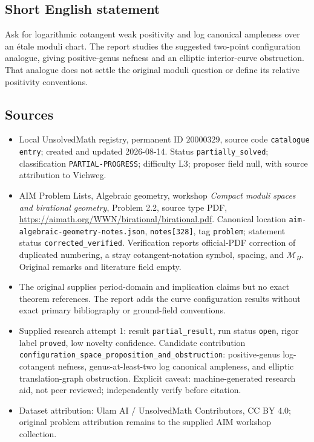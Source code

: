 \documentclass[11pt]{article}
\begin{document}
\subsection{Short English statement}
Ask for logarithmic cotangent weak positivity and log canonical ampleness over an étale moduli chart. The report studies the suggested two-point configuration analogue, giving positive-genus nefness and an elliptic interior-curve obstruction. That analogue does not settle the original moduli question or define its relative positivity conventions.
\subsection{Sources}
\begin{itemize}
\item Local UnsolvedMath registry, permanent ID $20000329$, source code \texttt{catalogue entry}; created and updated 2026-08-14. Status \texttt{partially\_solved}; classification \texttt{PARTIAL-PROGRESS}; difficulty L3; proposer field null, with source attribution to Viehweg.
\item AIM Problem Lists, Algebraic geometry, workshop \emph{Compact moduli spaces and birational geometry}, Problem 2.2, source type PDF, \url{https://aimath.org/WWN/birational/birational.pdf}. Canonical location \texttt{aim-algebraic-geometry-notes.json}, \texttt{notes[328]}, tag \texttt{problem}; statement status \texttt{corrected\_verified}. Verification reports official-PDF correction of duplicated numbering, a stray cotangent-notation symbol, spacing, and $\mathcal M_H$. Original remarks and literature field empty.
\item The original supplies period-domain and implication claims but no exact theorem references. The report adds the curve configuration results without exact primary bibliography or ground-field conventions.
\item Supplied research attempt 1: result \texttt{partial\_result}, run status \texttt{open}, rigor label \texttt{proved}, low novelty confidence. Candidate contribution \texttt{configuration\_space\_proposition\_and\_obstruction}: positive-genus log-cotangent nefness, genus-at-least-two log canonical ampleness, and elliptic translation-graph obstruction. Explicit caveat: machine-generated research aid, not peer reviewed; independently verify before citation.
\item Dataset attribution: Ulam AI / UnsolvedMath Contributors, CC BY 4.0; original problem attribution remains to the supplied AIM workshop collection.
\end{itemize}
\end{document}

